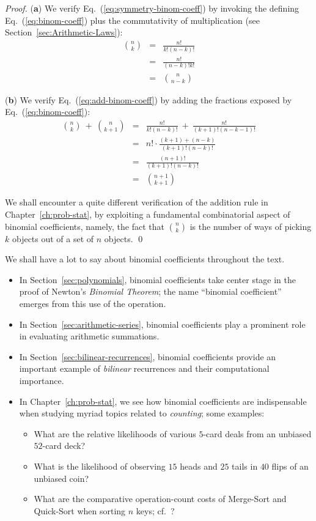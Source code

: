 \begin{proof}
({\bf a})
We verify Eq.~(\ref{eq:symmetry-binom-coeff}) by invoking the defining Eq.~(\ref{eq:binom-coeff}) plus the commutativity of multiplication (see Section~\ref{sec:Arithmetic-Laws}):
\begin{eqnarray*}
{n \choose k} & = & \frac{n!}{k!(n-k)!} \\
              & = & \frac{n!}{(n-k)!k!} \\
              & = & {n \choose {n-k}}
\end{eqnarray*}

\noindent ({\bf b})
We verify Eq.~(\ref{eq:add-binom-coeff}) by adding the fractions exposed by Eq.~(\ref{eq:binom-coeff}):
\begin{eqnarray*}
{n \choose k} \ + \ {n \choose {k+1}}
  & = &
\frac{n!}{k!(n-k)!} \ + \ \frac{n!}{(k+1)!(n-k-1)!} \\
  & = &
n! \cdot \frac{(k+1) + (n-k)} {(k+1)!(n-k)!} \\
  & = & 
\frac{(n+1)!}{(k+1)!(n-k)!} \\
  & = &
{{n+1} \choose {k+1}}
\end{eqnarray*}

\medskip

We shall encounter a quite different verification of the addition rule in Chapter~\ref{ch:prob-stat}, by exploiting a fundamental combinatorial aspect of binomial coefficients, namely, the fact that $\displaystyle {n \choose k}$ is the number of ways of picking $k$ objects out of a set of $n$ objects.  \qed
\end{proof}

\bigskip

\noindent
We shall have a lot to say about binomial coefficients throughout the text.
\begin{itemize}
\item
In Section~\ref{sec:polynomials}, binomial coefficients take center stage in the proof of Newton's {\it Binomial Theorem}; the name ``binomial coefficient'' emerges from this use of the operation.
\medskip\item
In Section~\ref{sec:arithmetic-series}, binomial coefficients play a prominent role in evaluating arithmetic summations.
\medskip\item
In Section~\ref{sec:bilinear-recurrences}, binomial coefficients provide an important example of {\em bilinear} recurrences and their computational importance.
\medskip\item
In Chapter~\ref{ch:prob-stat}, we see how binomial coefficients are indispensable when studying myriad topics related to {\em counting}; some examples:
  \begin{itemize}
  \item
What are the relative likelihoods of various $5$-card deals from an unbiased $52$-card deck?
  \medskip\item
What is the likelihood of observing $15$ {\sc head}s and $25$ {\sc tail}s in $40$ flips of an unbiased coin?
  \medskip\item
What are the comparative operation-count costs of Merge-Sort and Quick-Sort when sorting $n$ keys; cf.~\cite{CLRS}?
  \end{itemize}
\end{itemize}

